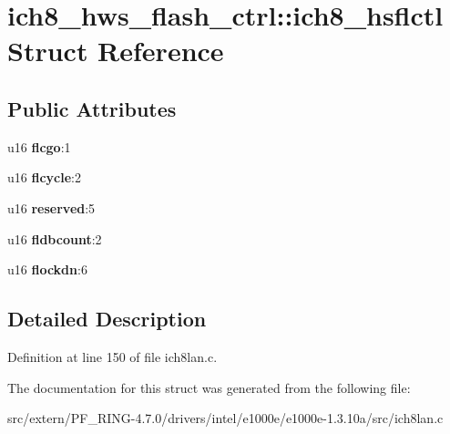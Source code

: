 \hypertarget{structich8__hws__flash__ctrl_1_1ich8__hsflctl}{
\section{ich8\_\-hws\_\-flash\_\-ctrl::ich8\_\-hsflctl Struct Reference}
\label{structich8__hws__flash__ctrl_1_1ich8__hsflctl}
}
\subsection*{Public Attributes}
\begin{DoxyCompactItemize}
\item 
\hypertarget{structich8__hws__flash__ctrl_1_1ich8__hsflctl_a848ee8f427783752088cb3d40378a5d8}{
u16 {\bfseries flcgo}:1}
\label{structich8__hws__flash__ctrl_1_1ich8__hsflctl_a848ee8f427783752088cb3d40378a5d8}

\item 
\hypertarget{structich8__hws__flash__ctrl_1_1ich8__hsflctl_a14915bc28736e9b06d4f516bb62f6c92}{
u16 {\bfseries flcycle}:2}
\label{structich8__hws__flash__ctrl_1_1ich8__hsflctl_a14915bc28736e9b06d4f516bb62f6c92}

\item 
\hypertarget{structich8__hws__flash__ctrl_1_1ich8__hsflctl_a9811d8c235a7217ec027822ee5a84a27}{
u16 {\bfseries reserved}:5}
\label{structich8__hws__flash__ctrl_1_1ich8__hsflctl_a9811d8c235a7217ec027822ee5a84a27}

\item 
\hypertarget{structich8__hws__flash__ctrl_1_1ich8__hsflctl_a7e21a4a8176bad479a6cd63360797b54}{
u16 {\bfseries fldbcount}:2}
\label{structich8__hws__flash__ctrl_1_1ich8__hsflctl_a7e21a4a8176bad479a6cd63360797b54}

\item 
\hypertarget{structich8__hws__flash__ctrl_1_1ich8__hsflctl_abb1d775c256a081c143eb08e30ea9fb8}{
u16 {\bfseries flockdn}:6}
\label{structich8__hws__flash__ctrl_1_1ich8__hsflctl_abb1d775c256a081c143eb08e30ea9fb8}

\end{DoxyCompactItemize}


\subsection{Detailed Description}


Definition at line 150 of file ich8lan.c.



The documentation for this struct was generated from the following file:\begin{DoxyCompactItemize}
\item 
src/extern/PF\_\-RING-\/4.7.0/drivers/intel/e1000e/e1000e-\/1.3.10a/src/ich8lan.c\end{DoxyCompactItemize}
